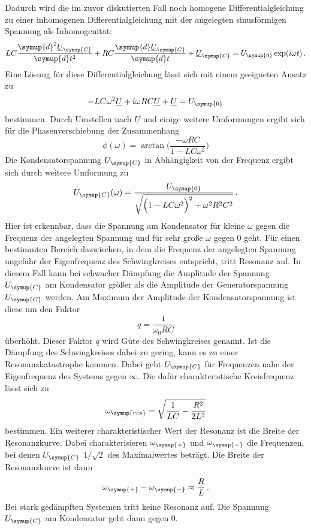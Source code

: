 Dadurch wird die im zuvor diskutierten Fall noch homogene Differentialgleichung zu einer
inhomogenen Differentialgleichung mit der angelegten sinusförmigen Spannung
als Inhomogenität:
\begin{equation}
  LC\frac{\symup{d}^2\underline{U}_{\symup{C}}}{\symup{d}t^2}
  +RC\frac{\symup{d}\underline{U}_{\symup{C}}}{\symup{d}t}
  +\underline{U}_{\symup{C}} = U_{\symup{0}}\exp(i\omega t) \,.
\end{equation}
Eine Lösung für diese Differentialgleichung lässt sich mit einem geeigneten Ansatz
zu
\begin{equation}
  -LC\omega^2\underline{U}+i\omega R C\underline{U}+\underline{U}=U_{\symup{0}}
\end{equation}
bestimmen. Durch Umstellen nach $\underline{U}$ und einige weitere Umformungen ergibt
sich für die Phasenverschiebung der Zusammenhang
\begin{equation}
  \phi(\omega)=\arctan\biggl(\frac{-\omega R C}{1-L C \omega^2}\biggr)
  \label{eqn:phase}
\end{equation}
Die Kondensatorspannung $U_{\symup{C}}$ in Abhängigkeit von der Frequenz ergibt sich
durch weitere Umformung zu
\begin{equation}
  U_{\symup{C}}(\omega)=\frac{U_{\symup{0}}}{\sqrt{\Bigl(1-LC\omega^2\Bigr)^2+\omega^2 R^2 C^2}} \,.
  \label{eqn:Ucfrequenz}
\end{equation}
Hier ist erkennbar, dass die Spannung am Kondensator für kleine $\omega$ gegen
die Frequenz der angelegten Spannung und für sehr große $\omega$ gegen $0$ geht.
Für einen bestimmten Bereich dazwischen, in dem die Frequenz der angelegten Spannung
ungefähr der Eigenfrequenz des Schwingkreises entspricht, tritt Resonanz auf. In
diesem Fall kann bei schwacher Dämpfung die Amplitude der Spannung $U_{\symup{C}}$ am Kondensator größer
als die Amplitude der Generatorspannung $U_{\symup{G}}$ werden.
Am Maximum der Amplitude der Kondensatorspannung ist diese um den Faktor
\begin{equation}
  q = \frac{1}{\omega_0 RC}
  \label{eqn:guete<}
\end{equation}
überhöht. Dieser Faktor $q$ wird Güte des Schwingkreises genannt.
Ist die Dämpfung
des Schwingkreises dabei zu gering, kann es zu einer Resonanzkatastrophe kommen.
Dabei geht $U_{\symup{C}}$ für Frequenzen nahe der Eigenfrequenz des Systems
gegen $\infty$. Die dafür charakteristische Kreisfrequenz lässt sich zu
\begin{equation}
  \omega_{\symup{res}}=\sqrt{\frac{1}{LC}-\frac{R^2}{2L^2}}
\end{equation}
bestimmen. Ein weiterer charakteristischer Wert der Resonanz ist die Breite
der Resonanzkurve. Dabei charakterisieren $\omega_{\symup{+}}$ und $\omega_{\symup{-}}$
die Frequenzen, bei denen $U_{\symup{C}}$ $1/\sqrt{2}$ des Maximalwertes beträgt.
Die Breite der Resonanzkurve ist dann
\begin{equation}
  \omega_{\symup{+}} - \omega_{\symup{-}} \approx \frac{R}{L} \,.
  \label{eqn:breite}
\end{equation}
Bei stark gedämpften Systemen tritt keine Resonanz auf. Die Spannung $U_{\symup{C}}$
am Kondensator geht dann gegen $0$.

